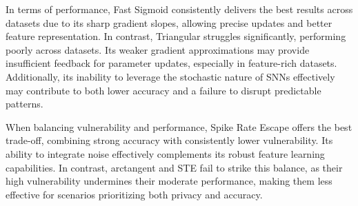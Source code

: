 In terms of performance, Fast Sigmoid consistently delivers the best results across datasets due to its sharp gradient slopes, allowing precise updates and better feature representation. In contrast, Triangular struggles significantly, performing poorly across datasets. Its weaker gradient approximations may provide insufficient feedback for  parameter updates, especially in feature-rich datasets. Additionally, its inability to leverage the stochastic nature of SNNs effectively may contribute to both lower accuracy and a failure to disrupt predictable patterns. 

When balancing vulnerability and performance, Spike Rate Escape offers the best trade-off, combining strong accuracy with consistently lower vulnerability. Its ability to integrate noise effectively complements its robust feature learning capabilities. In contrast, arctangent and STE fail to strike this balance, as their high vulnerability undermines their moderate performance, making them less effective for scenarios prioritizing both privacy and accuracy.






